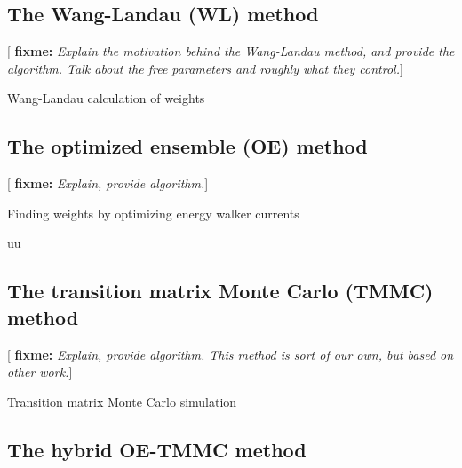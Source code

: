 \documentclass[11pt]{article}
\newcommand{\red}[1]{{\bf \color{red} #1}}
\newcommand{\fixme}[1]{[\red{fixme:} \emph{#1}]}
\begin{document}
\subsection{The Wang-Landau (WL) method}
\label{sec:wang_landau}

\fixme{Explain the motivation behind the Wang-Landau method, and
  provide the algorithm. Talk about the free parameters and roughly
  what they control.}

\begin{algorithm}[H]
  \caption{Wang-Landau calculation of weights}
  \label{alg:wang_landau}
\end{algorithm}



\subsection{The optimized ensemble (OE) method}
\label{sec:optimized_ensemble}

\fixme{Explain, provide algorithm.}

\begin{algorithm}[H]
  \caption{Finding weights by optimizing energy walker currents}
  \label{alg:optimized_ensemble}
\end{algorithm}
uu
\subsection{The transition matrix Monte Carlo (TMMC) method}
\label{sec:tmmc}

\fixme{Explain, provide algorithm. This method is sort of our own, but
  based on other work.}

\begin{algorithm}[H]
  \caption{Transition matrix Monte Carlo simulation}
  \label{alg:tmmc}
\end{algorithm}


\subsection{The hybrid OE-TMMC method}
\label{sec:oetmmc}
\end{document}
